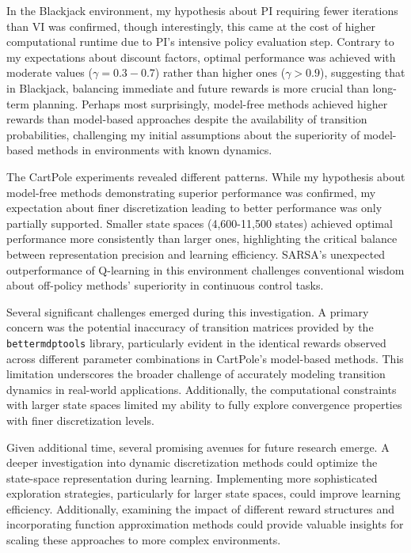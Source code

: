 \documentclass[conference]{IEEEtran}
\begin{document}
In the Blackjack environment, my hypothesis about PI requiring fewer iterations than VI was confirmed, though interestingly, this came at the cost of higher computational runtime due to PI's intensive policy evaluation step. Contrary to my expectations about discount factors, optimal performance was achieved with moderate values ($\gamma= 0.3-0.7$) rather than higher ones ($\gamma > 0.9$), suggesting that in Blackjack, balancing immediate and future rewards is more crucial than long-term planning. Perhaps most surprisingly, model-free methods achieved higher rewards than model-based approaches despite the availability of transition probabilities, challenging my initial assumptions about the superiority of model-based methods in environments with known dynamics.

The CartPole experiments revealed different patterns. While my hypothesis about model-free methods demonstrating superior performance was confirmed, my expectation about finer discretization leading to better performance was only partially supported. Smaller state spaces (4,600-11,500 states) achieved optimal performance more consistently than larger ones, highlighting the critical balance between representation precision and learning efficiency. SARSA's unexpected outperformance of Q-learning in this environment challenges conventional wisdom about off-policy methods' superiority in continuous control tasks.

Several significant challenges emerged during this investigation. A primary concern was the potential inaccuracy of transition matrices provided by the \texttt{bettermdptools} library, particularly evident in the identical rewards observed across different parameter combinations in CartPole's model-based methods. This limitation underscores the broader challenge of accurately modeling transition dynamics in real-world applications. Additionally, the computational constraints with larger state spaces limited my ability to fully explore convergence properties with finer discretization levels.

Given additional time, several promising avenues for future research emerge. A deeper investigation into dynamic discretization methods could optimize the state-space representation during learning. Implementing more sophisticated exploration strategies, particularly for larger state spaces, could improve learning efficiency. Additionally, examining the impact of different reward structures and incorporating function approximation methods could provide valuable insights for scaling these approaches to more complex environments.
\end{document}
